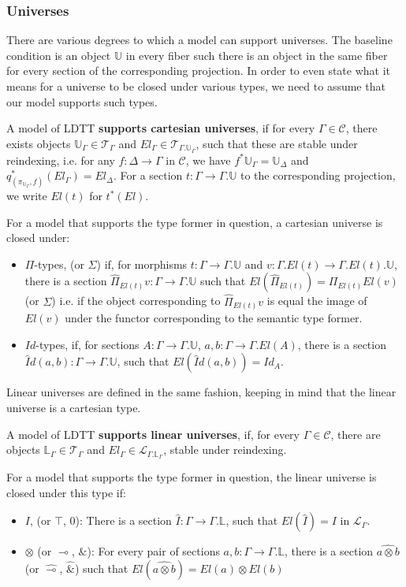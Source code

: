 \documentclass[a4paper,english]{lipics-v2018}
\begin{document}
\subsubsection{Universes}
There are various degrees to which a model can support universes. The baseline condition is an object $\mathbb{U}$ in every fiber such there is an object in the same fiber for every section of the corresponding projection. In order to even state what it means for a universe to be closed under various types, we need to assume that our model supports such types.
\begin{definition}A model of LDTT \textbf{supports cartesian universes}, if for every $\Gamma \in \mathcal{C}$, there exists objects $\mathbb{U}_\Gamma \in \mathcal{T}_{\Gamma}$ and $El_\Gamma \in \mathcal{T}_{\Gamma.\mathbb{U}_\Gamma}$, such that these are stable under reindexing, i.e. for any $f : \Delta \to \Gamma$ in $\mathcal{C}$, we have $f^*\mathbb{U}_\Gamma = \mathbb{U}_\Delta$ and $q_{(\pi_{\mathbb{U}_\Gamma}, f)}^*(El_\Gamma) = El_\Delta$. For a section $t : \Gamma \to \Gamma.\mathbb{U}$ to the corresponding projection, we write $El(t)$ for $t^*(El)$.

  For a model that supports the type former in question, a cartesian universe is closed under:
  \begin{itemize}
  \item $\Pi$-types, (or $\Sigma$) if, for morphisms $t : \Gamma \to \Gamma.\mathbb{U}$ and $v : \Gamma.El(t) \to \Gamma.El(t).\mathbb{U}$, there is a section $\hat \Pi_{El(t)}v : \Gamma \to \Gamma.\mathbb{U}$ such that $El(\hat \Pi_{El(t)}) = \Pi_{El(t)}El(v)$ (or $\Sigma$) i.e. if the object corresponding to $\hat \Pi_{El(t)}v$ is equal the image of $El(v)$ under the functor corresponding to the semantic type former.
  \item $Id$-types, if, for sections $A : \Gamma \to \Gamma.\mathbb{U}$, $a, b : \Gamma \to \Gamma.El(A)$, there is a section $\hat Id(a, b) : \Gamma \to \Gamma.\mathbb{U}$, such that $El(\hat Id(a, b)) = Id_A$.
  \end{itemize}
\end{definition}
Linear universes are defined in the same fashion, keeping in mind that the linear universe is a cartesian type.
\begin{definition}
  A model of LDTT \textbf{supports linear universes}, if, for every $\Gamma \in \mathcal{C}$, there are objects $\mathbb{L}_\Gamma \in \mathcal{T}_{\Gamma}$ and $El_\Gamma \in \mathcal{L}_{\Gamma.\mathbb{L}_\Gamma}$, stable under reindexing.

  For a model that supports the type former in question, the linear universe is closed under this type if:
  \begin{itemize}
    \item $I$, (or $\top$, $0$): There is a section $\hat I : \Gamma \to \Gamma.\mathbb{L}$, such that $El(\hat I) = I$ in $\mathcal{L}_\Gamma$.
    \item $\otimes$ (or $\multimap$, $\&$): For every pair of sections $a, b : \Gamma \to \Gamma.\mathbb{L}$, there is a section $\hat{a\otimes b}$ (or $\hat \multimap$, $\hat \&$) such that $El(\hat{a\otimes b}) = El(a)\otimes El(b)$
    \end{itemize}
  \end{definition}
\end{document}
